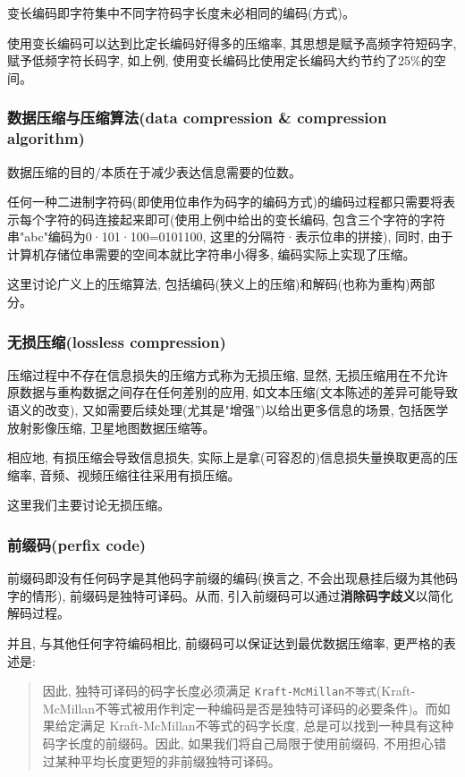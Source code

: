 \documentclass{article}
\begin{document}
\begin{CJK}{UTF8}{gbsn}
变长编码即字符集中不同字符码字长度未必相同的编码(方式)。

使用变长编码可以达到比定长编码好得多的压缩率, 其思想是赋予高频字符短码字, 赋予低频字符长码字, 如上例, 使用变长编码比使用定长编码大约节约了25\%的空间。

\subsubsection{数据压缩与压缩算法(data compression \& compression algorithm)}\label{header-n418}

数据压缩的目的/本质在于减少表达信息需要的位数。

任何一种二进制字符码(即使用位串作为码字的编码方式)的编码过程都只需要将表示每个字符的码连接起来即可(使用上例中给出的变长编码, 包含三个字符的字符串"abc"编码为0·101·100=0101100, 这里的分隔符·表示位串的拼接), 同时, 由于计算机存储位串需要的空间本就比字符串小得多, 编码实际上实现了压缩。

这里讨论广义上的压缩算法, 包括编码(狭义上的压缩)和解码(也称为重构)两部分。

\subsubsection{无损压缩(lossless compression)}\label{header-n422}

压缩过程中不存在信息损失的压缩方式称为无损压缩, 显然, 无损压缩用在不允许原数据与重构数据之间存在任何差别的应用, 如文本压缩(文本陈述的差异可能导致语义的改变), 又如需要后续处理(尤其是"增强'')以给出更多信息的场景, 包括医学放射影像压缩, 卫星地图数据压缩等。

相应地, 有损压缩会导致信息损失, 实际上是拿(可容忍的)信息损失量换取更高的压缩率, 音频、视频压缩往往采用有损压缩。

这里我们主要讨论无损压缩。

\subsubsection{前缀码(perfix code)}\label{header-n426}

前缀码即没有任何码字是其他码字前缀的编码(换言之, 不会出现悬挂后缀为其他码字的情形), 前缀码是独特可译码。从而, 引入前缀码可以通过\textbf{消除码字歧义}以简化解码过程。

并且, 与其他任何字符编码相比, 前缀码可以保证达到最优数据压缩率, 更严格的表述是:

\begin{quote}
因此, 独特可译码的码字长度必须满足
\texttt{Kraft-McMillan不等式}(Kraft-McMillan不等式被用作判定一种编码是否是独特可译码的必要条件)。而如果给定满足
Kraft-McMillan不等式的码字长度,
总是可以找到一种具有这种码字长度的前缀码。因此,
如果我们将自己局限于使用前缀码,
不用担心错过某种平均长度更短的非前缀独特可译码。
\end{quote}


\end{CJK}
\end{document}

